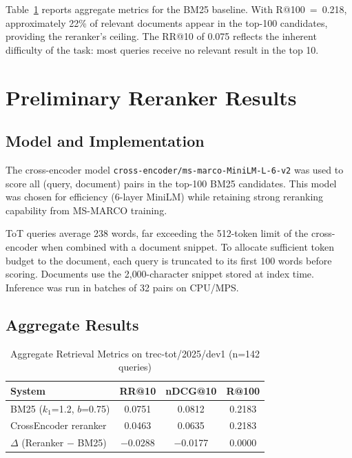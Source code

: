 \documentclass[conference]{IEEEtran}
\begin{document}
Table~\ref{tab:aggregate} reports aggregate metrics for the BM25 baseline.
With R@100~=~0.218, approximately 22\% of relevant documents appear in the
top-100 candidates, providing the reranker's ceiling.
The RR@10 of 0.075 reflects the inherent difficulty of the task:
most queries receive no relevant result in the top 10.

\section{Preliminary Reranker Results}
\label{sec:reranker}

\subsection{Model and Implementation}

The cross-encoder model \texttt{cross-encoder/ms-marco-MiniLM-L-6-v2}
was used to score all (query, document) pairs in the top-100 BM25 candidates.
This model was chosen for efficiency (6-layer MiniLM) while retaining strong
reranking capability from MS-MARCO training.

ToT queries average 238 words, far exceeding the 512-token limit of the
cross-encoder when combined with a document snippet.
To allocate sufficient token budget to the document, each query is
truncated to its first 100 words before scoring.
Documents use the 2{,}000-character snippet stored at index time.
Inference was run in batches of 32 pairs on CPU/MPS.

\subsection{Aggregate Results}

\begin{table}[t]
\caption{Aggregate Retrieval Metrics on trec-tot/2025/dev1 (n=142 queries)}
\label{tab:aggregate}
\centering
\begin{tabular}{lccc}
\toprule
System & RR@10 & nDCG@10 & R@100 \\
\midrule
BM25 ($k_1$=1.2, $b$=0.75) & 0.0751 & 0.0812 & 0.2183 \\
CrossEncoder reranker       & 0.0463 & 0.0635 & 0.2183 \\
\midrule
$\Delta$ (Reranker $-$ BM25) & $-$0.0288 & $-$0.0177 & 0.0000 \\
\bottomrule
\end{tabular}
\end{table}
\end{document}
